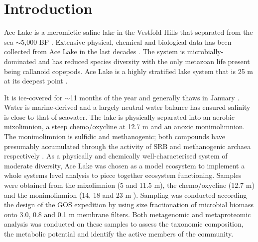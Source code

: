\section{Introduction}
\acresetall
Ace Lake is a meromictic saline lake in the Vestfold Hills that separated from the sea $\sim$5,000 BP \cite{Bird1991}. 
Extensive physical, chemical and biological data has been collected from Ace Lake in the last decades \cite{Rankin1999}.
The system is microbially-dominated and has reduced species diversity \cite{Bowman2000a} with the only metazoan life present being callanoid copepods. %
Ace Lake is a highly stratified lake system that is 25 m at its deepest point .

It is ice-covered for $\sim$11 months of the year and generally thaws in January \cite{Rankin1999}.
Water is marine-derived and a largely neutral water balance has ensured salinity is close to that of seawater.
The lake is physically separated into an aerobic mixolimnion, a steep chemo/oxycline at 12.7 m and an anoxic monimolimnion.
The monimolimnion is sulfidic and methanogenic; both compounds have presumably accumulated through the activity of \ac{SRB} and methanogenic archaea respectively \cite{Rankin1999, Lauro2011} .
As a physically and chemically well-characterised system of moderate diversity, Ace Lake was chosen as a model ecosystem to implement a whole systems level analysis to piece together ecosystem functioning.
Samples were obtained from the mixolimnion (5 and 11.5 m), the chemo/oxycline (12.7 m) and the monimolimnion (14, 18 and 23 m ).
Sampling was conducted according the design of the \ac{GOS} expedition \cite{Rusch2007} by using size fractionation of microbial biomass onto 3.0, 0.8 and 0.1 \textmu{}m membrane filters.
Both metagenomic and metaproteomic analysis was conducted on these samples to assess the taxonomic composition, the metabolic potential and identify the active members of the community.


